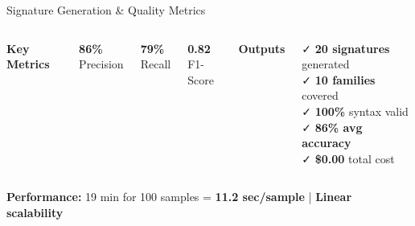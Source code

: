 \documentclass[11pt,aspectratio=16:9]{beamer}
\begin{document}
\begin{frame}{Signature Generation \& Quality Metrics}
  \vspace{0.5cm}
  \begin{columns}
    \centering
    {\textbf{\textcolor{accent1}{Key Metrics}}}\\[0.3cm]
    \begin{tcolorbox}[colback=accent1!15, colframe=accent1, boxrule=2pt, arc=5pt]
      \LARGE \textbf{\textcolor{accent1}{86\%}}\\
      {\small Precision}
    \end{tcolorbox}
    
    \begin{tcolorbox}[colback=accent2!15, colframe=accent2, boxrule=2pt, arc=5pt]
      \LARGE \textbf{\textcolor{accent2}{79\%}}\\
      {\small Recall}
    \end{tcolorbox}
    
    \begin{tcolorbox}[colback=accent3!15, colframe=accent3, boxrule=2pt, arc=5pt]
      \LARGE \textbf{\textcolor{accent3}{0.82}}\\
      {\small F1-Score}
    \end{tcolorbox}
    
    {\textbf{\textcolor{accent1}{Outputs}}}\\[0.3cm]
    \begin{tcolorbox}[colback=lightgray, colframe=darkblue, boxrule=2pt]
      {\small
      ✓ \textbf{20 signatures} generated\\
      ✓ \textbf{10 families} covered\\
      ✓ \textbf{100\%} syntax valid\\
      ✓ \textbf{86\% avg accuracy}\\
      ✓ \textbf{\$0.00} total cost
      }
    \end{tcolorbox}
  \end{columns}
  
  \vspace{0.8cm}
  \begin{tcolorbox}[colback=accent3!10, colframe=accent3]
    \centering \small
    \textbf{Performance:} 19 min for 100 samples = \textbf{11.2 sec/sample} | \textbf{Linear scalability}
  \end{tcolorbox}
\end{frame}
\end{document}
